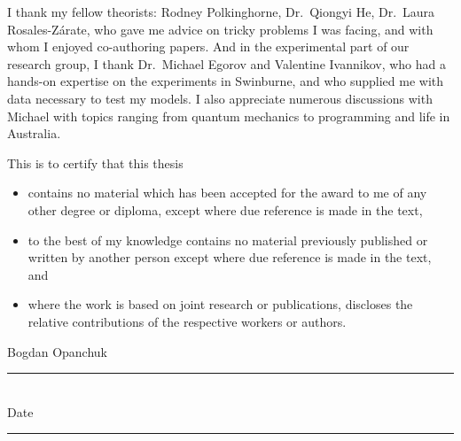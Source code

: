 I thank my fellow theorists: Rodney Polkinghorne, Dr.~Qiongyi He, Dr.~Laura Rosales-Z\'{a}rate, who gave me advice on tricky problems I was facing, and with whom I enjoyed co-authoring papers.
And in the experimental part of our research group, I thank Dr.~Michael Egorov and Valentine Ivannikov, who had a hands-on expertise on the  experiments in Swinburne, and who supplied me with data necessary to test my models. I also appreciate numerous discussions with Michael with topics ranging from quantum mechanics to programming and life in Australia.



\cleardoublepage


This is to certify that this thesis

\begin{itemize}
\item[\hfleuron] contains no material which has been accepted for the award to me of any other degree or diploma, except where due reference is made in the text,
\item[\hfleuron] to the best of my knowledge contains no material previously published or written by another person except where due reference is made in the text, and
\item[\hfleuron] where the work is based on joint research or publications, discloses the relative contributions of the respective workers or authors.
\end{itemize}

\vspace{2cm}

\begin{flushright}
Bogdan Opanchuk \hspace{0.5cm} \rule{4cm}{1pt} \\
\vspace{1cm}
Date \hspace{0.5cm} \rule{4cm}{1pt}
\end{flushright}
